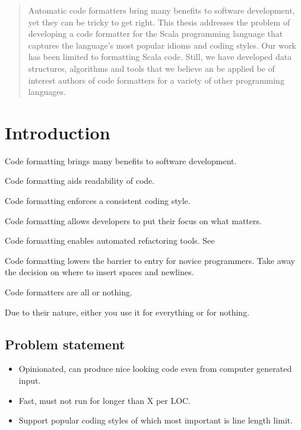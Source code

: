 \documentclass[11pt,a4paper]{article}
\begin{document}



\begin{abstract}
  Automatic code formatters bring many benefits to software development, yet they can be tricky to get right.
  This thesis addresses the problem of developing a code formatter for the
  Scala programming language that captures the language's most popular idioms
  and coding styles.
  Our work has been limited to formatting Scala code.
  Still, we have developed data structures, algorithms and tools that we believe an be applied be of interest authors of code formatters for a variety of other programming languages.
\end{abstract}
\tableofcontents

\section{Introduction} %
\label{sec:Introduction}
%
Code formatting brings many benefits to software development.

Code formatting aids readability of code.

Code formatting enforces a consistent coding style.

Code formatting allows developers to put their focus on what matters.

Code formatting enables automated refactoring tools.
See~\autocite{wright_large-scale_2013}

Code formatting lowers the barrier to entry for novice programmers.
Take away the decision on where to insert spaces and newlines.

Code formatters are all or nothing.

Due to their nature, either you use it for everything or for nothing.

\subsection{Problem statement}
\begin{itemize}
  \item Opinionated, can produce nice looking code even from computer generated input.
  \item Fast, must not run for longer than X per LOC.
  \item Support popular coding styles of which most important is line length limit.
\end{itemize}
\end{document}
